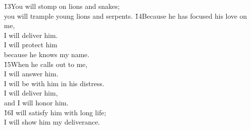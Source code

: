 \begin{poetry}
\poeml \v{13}You will stomp on lions and snakes; \\
\poemll    you will trample young lions and serpents.
\poeml \v{14}Because he has focused his love on me, \\
\poemll    I will deliver him. \\
\poeml I will protect him \\
\poemll    because he knows my name. \\
\poeml \v{15}When he calls out to me, \\
\poemll    I will answer him. \\
\poeml I will be with him in his distress. \\
\poemll    I will deliver him, \\
\poemlll       and I will honor him. \\
\poeml \v{16}I will satisfy him with long life; \\
\poemll    I will show him my deliverance.
\end{poetry}

